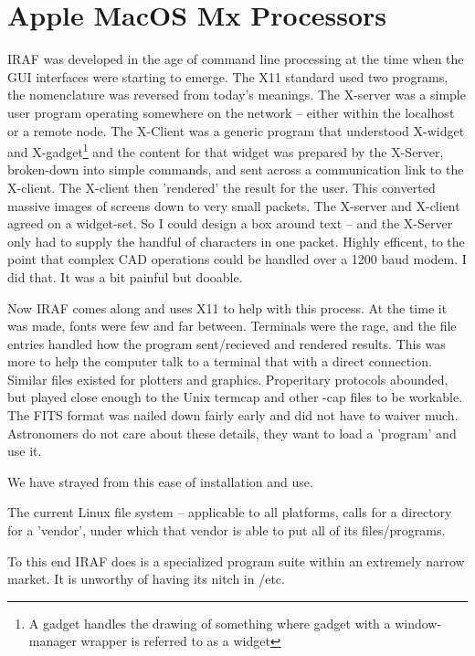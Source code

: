 \renewcommand{\footerfilename}{Apple.tex}

\section{Apple MacOS Mx Processors}

IRAF was developed in the age of command line processing at the time when the
GUI interfaces were starting to emerge. The X11 standard used two programs,
the nomenclature was reversed from today's meanings. The X-server was a 
simple user program operating somewhere on the network -- either within
the localhost or a remote node. The X-Client was a generic program that
understood X-widget and X-gadget\footnote{A gadget handles the drawing
of something where  gadget with a window-manager wrapper is referred to
as a widget} and the content for that widget was prepared by the X-Server,
broken-down into simple commands, and sent across a communication link
to the X-client. The X-client then 'rendered' the result for the user.
This converted massive images of screens down to very small packets.
The X-server and X-client agreed on a widget-set. So I could design a
box around text -- and the X-Server only had to supply the handful of
characters in one packet.  Highly efficent, to the point that complex
CAD operations could be handled over a 1200 baud modem. I did that.
It was a bit painful but dooable. 

Now IRAF comes along and uses X11 to help with this process. At the
time it was made, fonts were few and far between. Terminals were
the rage, and the  file entries handled how the program
sent/recieved and rendered results. This was more to help the computer
talk to a terminal that with a direct connection. Similar files existed
for plotters and graphics. Properitary protocols abounded, but played
close enough to the Unix termcap and other -cap files to be workable.
The FITS format was nailed down fairly early and did not have to
waiver much. Astronomers do not care about these details, they want
to load a 'program' and use it.

We have strayed from this ease of installation and use.

The current Linux file system -- applicable to all platforms,
calls for a  directory for a 'vendor', under which
that vendor is able to put all of its files/programs. 

To this end IRAF does is a specialized program suite within an
extremely narrow market. It is unworthy of having its nitch in /etc.

